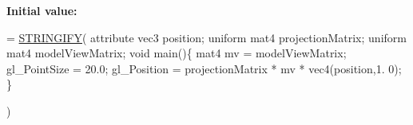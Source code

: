 {\bfseries Initial value\+:}
\begin{DoxyCode}
= \hyperlink{_a_r_shaders_8h_ab06e1eb2e9bf38e0d452b1f796aed208}{STRINGIFY}(
                                                 attribute vec3 position;
                                                 uniform mat4 projectionMatrix;
                                                 uniform mat4 modelViewMatrix;
                                                 \textcolor{keywordtype}{void} main()\{
                                                     mat4 mv = modelViewMatrix;
                                                     gl\_PointSize = 20.0;
                                                     gl\_Position = projectionMatrix * mv * vec4(position,1.
      0);
                                                 \}
                                                 
                                                 )
\end{DoxyCode}
